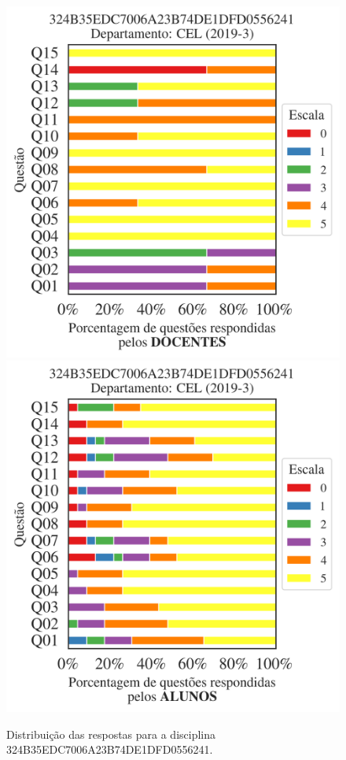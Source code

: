 \documentclass[a4paper,10pt]{article}
\begin{document}
\begin{figure}[h]
\centering
\includegraphics[width=0.485\linewidth]{analise_disciplina_departamento_CEL_324B35EDC7006A23B74DE1DFD0556241_docentes.png}
\includegraphics[width=0.485\linewidth]{analise_disciplina_departamento_CEL_324B35EDC7006A23B74DE1DFD0556241_alunos.png}
\caption{\label{fig:analise_geral_departamento}                Distribuição das respostas para a disciplina 324B35EDC7006A23B74DE1DFD0556241. }
\end{figure}
\end{document}
